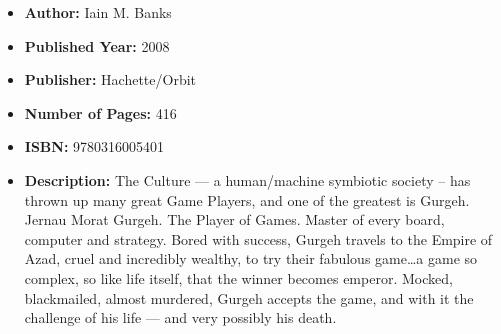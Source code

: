\documentclass{tufte-handout}
\begin{document}
\begin{itemize}
    \item[] \textbf{Author:} Iain M. Banks
    \item[] \textbf{Published Year:} 2008
    \item[] \textbf{Publisher:} Hachette/Orbit
    \item[] \textbf{Number of Pages:} 416      
    \item[] \textbf{ISBN:} 9780316005401
    \item[] \textbf{Description:} The Culture --- a human/machine symbiotic society – has thrown up many great Game Players, and one of the greatest is Gurgeh. Jernau Morat Gurgeh. The Player of Games. Master of every board, computer and strategy. Bored with success, Gurgeh travels to the Empire of Azad, cruel and incredibly wealthy, to try their fabulous game\ldots a game so complex, so like life itself, that the winner becomes emperor. Mocked, blackmailed, almost murdered, Gurgeh accepts the game, and with it the challenge of his life --- and very possibly his death.

\end{itemize}
\end{document}
